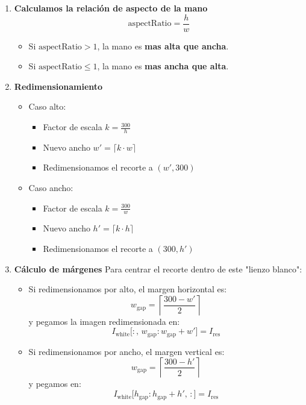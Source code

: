 \begin{enumerate}
    \item \textbf{Calculamos la relación de aspecto de la mano}\newline
    \[\mathrm{aspectRatio} = \frac{h}{w}\]
        \begin{itemize}
            \item Si $\mathrm{aspectRatio} > 1$, la mano es \textbf{mas alta que ancha}.
            \item Si $\mathrm{aspectRatio} \le 1$, la mano es \textbf{mas ancha que alta}.
        \end{itemize}
    \item \textbf{Redimensionamiento}
        \begin{itemize}
            \item Caso alto:
            \begin{itemize}
                \item Factor de escala $k = \frac{\mathrm{300}}{h}$
                \item  Nuevo ancho $w' = \lceil k \cdot w\rceil$
                \item Redimensionamos el recorte a $(w', 300)$
            \end{itemize}
            \item Caso ancho:
            \begin{itemize}
                \item Factor de escala $k = \frac{\mathrm{300}}{w}$
                \item  Nuevo ancho $h' = \lceil k \cdot h\rceil$
                \item Redimensionamos el recorte a $(300, h')$
            \end{itemize} 
        \end{itemize}
    \item \textbf{Cálculo de márgenes}\newline
        Para centrar el recorte dentro de este "lienzo blanco":
        \begin{itemize}
            \item Si redimensionamos por alto, el margen horizontal es:\newline
            \[w_{\mathrm{gap}} = \left\lceil\frac{\mathrm{300} - w'}{2}\right\rceil\]
            y pegamos la imagen redimensionada en:\newline \[I_{\mathrm{white}}\bigl[:,\,w_{\mathrm{gap}}:w_{\mathrm{gap}}+w'\bigr] = I_{\mathrm{res}}\]
            \item Si redimensionamos por ancho, el margen vertical es: \newline
            \[w_{\mathrm{gap}} = \left\lceil\frac{\mathrm{300} - h'}{2}\right\rceil\]
            y pegamos en: \newline \[I_{\mathrm{white}}\bigl[h_{\mathrm{gap}}:h_{\mathrm{gap}}+h',\,:\bigr] = I_{\mathrm{res}}\]
        \end{itemize}
\end{enumerate}

